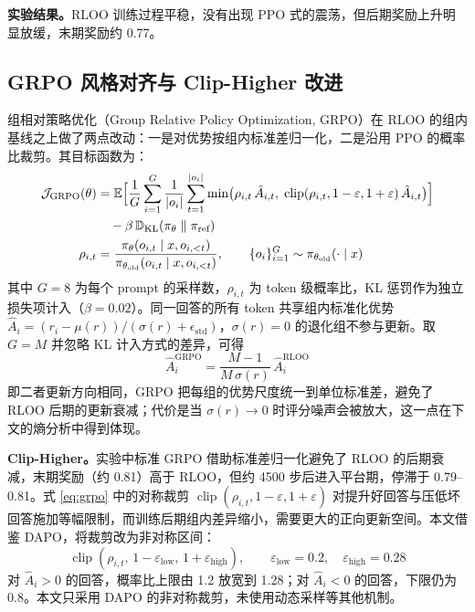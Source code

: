 \documentclass[fontset=fandol,type=master,campus=shenzhen,etitleauto=true]{hithesisbook}
\begin{document}
\textbf{实验结果。}RLOO 训练过程平稳，没有出现 PPO 式的震荡，但后期奖励上升明显放缓，末期奖励约 0.77。

\subsection{GRPO 风格对齐与 Clip-Higher 改进}\label{grpo-ux98ceux683cux5bf9ux9f50ux4e0e-clip-higher-ux6539ux8fdb}

组相对策略优化（Group Relative Policy Optimization, GRPO）\cite{ref34}在 RLOO 的组内基线之上做了两点改动：一是对优势按组内标准差归一化，二是沿用 PPO 的概率比裁剪。其目标函数为：
\begin{equation}\label{eq:grpo}
\begin{aligned}
\mathcal{J}_{\text{GRPO}}(\theta) &= \mathbb{E} \Bigl[ \frac{1}{G}\sum_{i=1}^{G} \frac{1}{|o_i|}\sum_{t=1}^{|o_i|} \min\bigl( \rho_{i,t}\, \hat{A}_{i,t},\; \operatorname{clip}(\rho_{i,t}, 1-\varepsilon, 1+\varepsilon)\, \hat{A}_{i,t} \bigr) \Bigr] \\
&\quad - \beta\, \mathbb{D}_{\text{KL}}(\pi_\theta \parallel \pi_{\text{ref}}) \\
\rho_{i,t} &= \frac{\pi_\theta(o_{i,t} \mid x, o_{i,<t})}{\pi_{\theta_{\text{old}}}(o_{i,t} \mid x, o_{i,<t})}, \qquad \{o_i\}_{i=1}^{G} \sim \pi_{\theta_{\text{old}}}(\cdot \mid x)
\end{aligned}
\end{equation}
其中 $G = 8$ 为每个 prompt 的采样数，$\rho_{i,t}$ 为 token 级概率比，KL 惩罚作为独立损失项计入（$\beta = 0.02$）。同一回答的所有 token 共享组内标准化优势 $\hat{A}_i = (r_i - \mu(r)) / (\sigma(r) + \epsilon_{\text{std}})$，$\sigma(r) = 0$ 的退化组不参与更新。取 $G = M$ 并忽略 KL 计入方式的差异，可得
\begin{equation}\label{eq:rloo-grpo}
\hat{A}_i^{\text{GRPO}} = \frac{M - 1}{M\, \sigma(r)}\, \hat{A}_i^{\text{RLOO}}
\end{equation}
即二者更新方向相同，GRPO 把每组的优势尺度统一到单位标准差，避免了 RLOO 后期的更新衰减；代价是当 $\sigma(r) \to 0$ 时评分噪声会被放大，这一点在下文的熵分析中得到体现。

\textbf{Clip-Higher。}实验中标准 GRPO 借助标准差归一化避免了 RLOO 的后期衰减，末期奖励（约 0.81）高于 RLOO，但约 4500 步后进入平台期，停滞于 0.79--0.81。式 \eqref{eq:grpo} 中的对称裁剪 $\operatorname{clip}(\rho_{i,t}, 1-\varepsilon, 1+\varepsilon)$ 对提升好回答与压低坏回答施加等幅限制，而训练后期组内差异缩小，需要更大的正向更新空间。本文借鉴 DAPO\cite{ref35}，将裁剪改为非对称区间：
\begin{equation}\label{eq:clip-higher}
\operatorname{clip}(\rho_{i,t},\, 1 - \varepsilon_{\text{low}},\, 1 + \varepsilon_{\text{high}}), \qquad \varepsilon_{\text{low}} = 0.2, \quad \varepsilon_{\text{high}} = 0.28
\end{equation}
对 $\hat{A}_i > 0$ 的回答，概率比上限由 1.2 放宽到 1.28；对 $\hat{A}_i < 0$ 的回答，下限仍为 0.8。本文只采用 DAPO 的非对称裁剪，未使用动态采样等其他机制。
\end{document}
